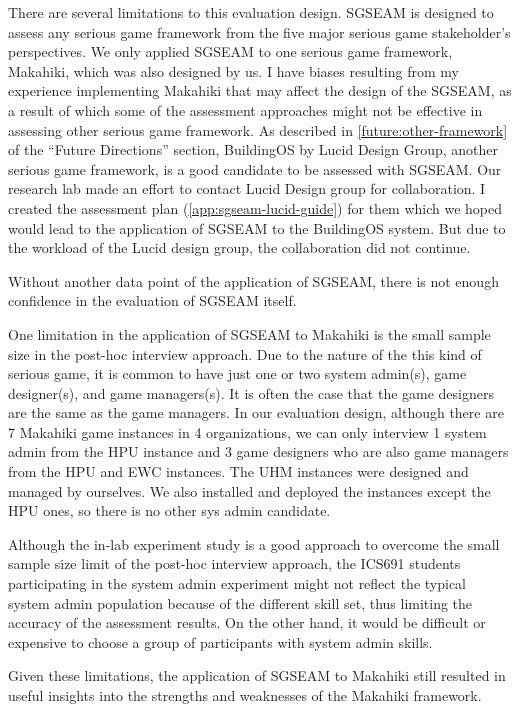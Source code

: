 There are several limitations to this evaluation design. SGSEAM is designed to assess any serious game framework from the five major serious game stakeholder's perspectives. We only applied SGSEAM to one serious game framework, Makahiki, which was also designed by us. I have biases resulting from my experience implementing Makahiki that may affect the design of the SGSEAM, as a result of which some of the assessment approaches might not be effective in assessing other serious game framework. As described in \autoref{future:other-framework} of the ``Future Directions'' section, BuildingOS\cite{building-dashboard} by Lucid Design Group, another serious game framework, is a good candidate to be assessed with SGSEAM. Our research lab made an effort to contact Lucid Design group for collaboration. I created the assessment plan (\autoref{app:sgseam-lucid-guide}) for them which we hoped would lead to the application of SGSEAM to the BuildingOS system. But due to the workload of the Lucid design group, the collaboration did not continue.

Without another data point of the application of SGSEAM, there is not enough confidence in the evaluation of SGSEAM itself. 

One limitation in the application of SGSEAM to Makahiki is the small sample size in the post-hoc interview approach. Due to the nature of the this kind of serious game, it is common to have just one or two system admin(s), game designer(s), and game managers(s). It is often the case that the game designers are the same as the game managers. In our evaluation design, although there are 7 Makahiki game instances in 4 organizations, we can only interview 1 system admin from the HPU instance and 3 game designers who are also game managers from the HPU and EWC instances. The UHM instances were designed and managed by ourselves. We also installed and deployed the instances except the HPU ones, so there is no other sys admin candidate.  

Although the in-lab experiment study is a good approach to overcome the small sample size limit of the post-hoc interview approach, the ICS691 students participating in the system admin experiment might not reflect the typical system admin population because of the different skill set, thus limiting the accuracy of the assessment results. On the other hand, it would be difficult or expensive to choose a group of participants with system admin skills.

Given these limitations, the application of SGSEAM to Makahiki still resulted in useful insights into the strengths and weaknesses of the Makahiki framework.

